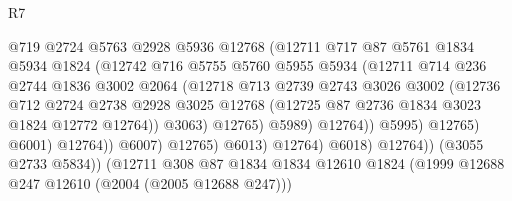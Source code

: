 \begin{lexlean}{R7}
\begin{coremodule}
                                    @719
                                    @2724
                                    @5763
                                    @2928
                                    @5936
                                    @12768
                                    (@12711
                                      @717
                                      @87
                                      @5761
                                      @1834
                                      @5934
                                      @1824
                                      (@12742
                                        @716
                                        @5755
                                        @5760
                                        @5955
                                        @5934
                                        (@12711
                                          @714
                                          @236
                                          @2744
                                          @1836
                                          @3002
                                          @2064
                                          (@12718
                                            @713
                                            @2739
                                            @2743
                                            @3026
                                            @3002
                                            (@12736
                                              @712
                                              @2724
                                              @2738
                                              @2928
                                              @3025
                                              @12768
                                              (@12725 @87 @2736 @1834 @3023 @1824 @12772 @12764))
                                            @3063)
                                          @12765)
                                        @5989)
                                      @12764))
                                  @5995)
                                @12765)
                              @6001)
                            @12764))
                        @6007)
                      @12765)
                    @6013)
                  @12764)
                @6018)
              @12764))
          (@3055 @2733 @5834))
        (@12711
          @308
          @87
          @1834
          @1834
          @12610
          @1824
          (@1999 @12688 @247 @12610 (@2004 (@2005 @12688 @247)))

\end{coremodule}
\end{lexlean}
